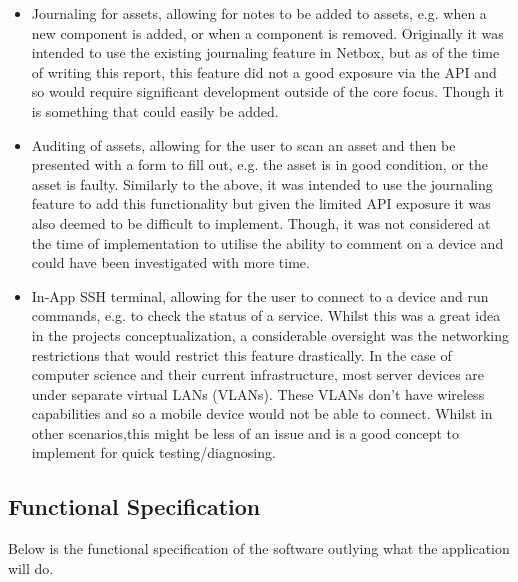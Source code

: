 \documentclass [11pt,a4paper]{article}
\begin{document}
\begin{itemize}
\item Journaling for assets, allowing for notes to be added to assets, e.g. when a new component is added, or when a component is removed.
\subitem Originally it was intended to use the existing journaling feature in Netbox, but as of the time of writing this report, this feature did not a good exposure via the API and so would require significant development outside of the core focus. Though it is something that could easily be added.

\item Auditing of assets, allowing for the user to scan an asset and then be presented with a form to fill out, e.g. the asset is in good condition, or the asset is faulty. 
\subitem Similarly to the above, it was intended to use the journaling feature to add this functionality but given the limited API exposure it was also deemed to be difficult to implement. Though, it was not considered at the time of implementation to utilise the ability to comment on a device and could have been investigated with more time. 

\item In-App SSH terminal, allowing for the user to connect to a device and run commands, e.g. to check the status of a service. 
\subitem Whilst this was a great idea in the projects conceptualization, a considerable oversight was the networking restrictions that would restrict this feature drastically. In the case of computer science and their current infrastructure, most server devices are under separate virtual LANs (VLANs). These VLANs don't have wireless capabilities and so a mobile device would not be able to connect. Whilst in other scenarios,this might be less of an issue and is a good concept to implement for quick testing/diagnosing. 
\end{itemize}


\subsection{Functional Specification}
Below is the functional specification of the software outlying what the application will do.
\end{document}

